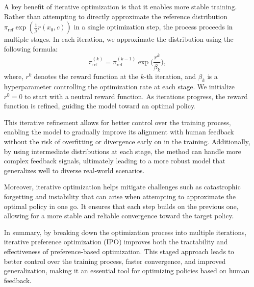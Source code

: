A key benefit of iterative optimization is that it enables more stable training. Rather than attempting to directly approximate the reference distribution $\pi_{\text{ref}} \exp\left(\frac{1}{\beta} r(x_0, c)\right)$ in a single optimization step, the process proceeds in multiple stages. In each iteration, we approximate the distribution using the following formula:
\small
\begin{equation}
\pi_{\text{ref}}^{(k)} = \pi_{\text{ref}}^{(k-1)} \exp\Big(\frac{r^k}{\beta_{k}} \Big),
\end{equation}
\normalsize
where, $r^k$ denotes the reward function at the $k$-th iteration, and $\beta_k$ is a hyperparameter controlling the optimization rate at each stage. We initialize $r^0 = 0$ to start with a neutral reward function. As iterations progress, the reward function is refined, guiding the model toward an optimal policy.


This iterative refinement allows for better control over the training process, enabling the model to gradually improve its alignment with human feedback without the risk of overfitting or divergence early on in the training. Additionally, by using intermediate distributions at each stage, the method can handle more complex feedback signals, ultimately leading to a more robust model that generalizes well to diverse real-world scenarios.

Moreover, iterative optimization helps mitigate challenges such as catastrophic forgetting and instability that can arise when attempting to approximate the optimal policy in one go. It ensures that each step builds on the previous one, allowing for a more stable and reliable convergence toward the target policy.

In summary, by breaking down the optimization process into multiple iterations, iterative preference optimization (IPO) improves both the tractability and effectiveness of preference-based optimization. This staged approach leads to better control over the training process, faster convergence, and improved generalization, making it an essential tool for optimizing policies based on human feedback.



